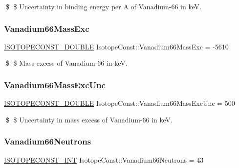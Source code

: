 \$ \$ Uncertainty in binding energy per A of Vanadium-\/66 in keV. \mbox{\label{group___isotope_const-_vanadium-_v66_ga17f347c21fdc927da5c9b33f49a1c058}} 
\subsubsection{\texorpdfstring{Vanadium66\+Mass\+Exc}{Vanadium66MassExc}}
{\footnotesize\ttfamily \mbox{\hyperlink{group___isotope_const-_macros_ga8f45a7272ce02c0b4c65c44636ed719a}{I\+S\+O\+T\+O\+P\+E\+C\+O\+N\+S\+T\+\_\+\+D\+O\+U\+B\+LE}} Isotope\+Const\+::\+Vanadium66\+Mass\+Exc = -\/5610}

\$ \$ Mass excess of Vanadium-\/66 in keV. \mbox{\label{group___isotope_const-_vanadium-_v66_gaab204bb017b4d66e0c43c6588fad08dd}} 
\subsubsection{\texorpdfstring{Vanadium66\+Mass\+Exc\+Unc}{Vanadium66MassExcUnc}}
{\footnotesize\ttfamily \mbox{\hyperlink{group___isotope_const-_macros_ga8f45a7272ce02c0b4c65c44636ed719a}{I\+S\+O\+T\+O\+P\+E\+C\+O\+N\+S\+T\+\_\+\+D\+O\+U\+B\+LE}} Isotope\+Const\+::\+Vanadium66\+Mass\+Exc\+Unc = 500}

\$ \$ Uncertainty in mass excess of Vanadium-\/66 in keV. \mbox{\label{group___isotope_const-_vanadium-_v66_ga191a0f33845293c272da14841b084d69}} 
\subsubsection{\texorpdfstring{Vanadium66\+Neutrons}{Vanadium66Neutrons}}
{\footnotesize\ttfamily \mbox{\hyperlink{group___isotope_const-_macros_ga5f18360b3e99483a35c32d789e62621c}{I\+S\+O\+T\+O\+P\+E\+C\+O\+N\+S\+T\+\_\+\+I\+NT}} Isotope\+Const\+::\+Vanadium66\+Neutrons = 43}

